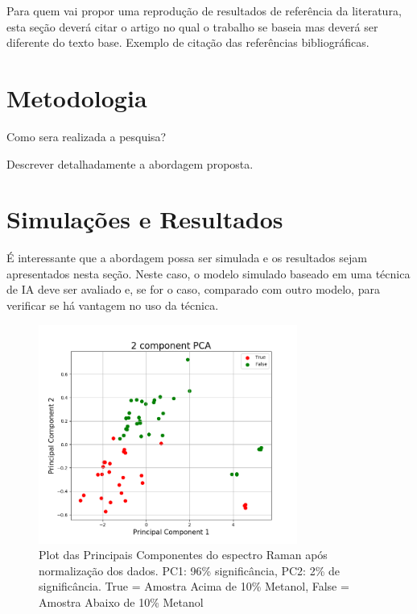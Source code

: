 \documentclass{article}
\begin{document}
Para quem vai propor uma reprodução de resultados de referência da literatura, esta
seção deverá citar o artigo no qual o trabalho se baseia mas deverá ser diferente
do texto base.
Exemplo de citação das referências
bibliográficas.
\vspace{2cm}
\section{Metodologia}
\vspace{1cm} Como sera realizada a pesquisa? \vspace{1cm}

Descrever detalhadamente a abordagem proposta. \vspace{2cm}
\section{Simulações e Resultados}
\vspace{1cm} É interessante que a abordagem possa ser simulada e
os resultados sejam apresentados nesta seção. Neste caso, o modelo
simulado baseado em uma técnica de IA deve ser avaliado e, se for o caso,
comparado com outro modelo, para verificar se há vantagem no uso
da técnica. \vspace{2cm}

\begin{figure}[ht]
\centering
\includegraphics[width=8.5cm]{pca}
\caption{Plot das Principais Componentes do espectro Raman após normalização dos dados. PC1: 96\% significância, PC2: 2\% de significância. True = Amostra Acima de 10\% Metanol, False = Amostra Abaixo de 10\% Metanol}
\label{pca}
\end{figure}
\end{document}
